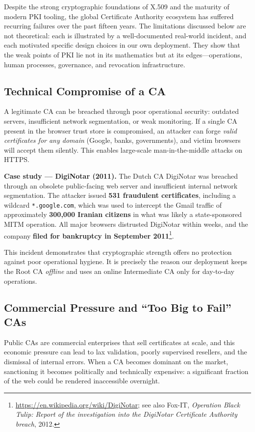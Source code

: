 \documentclass[10pt,twocolumn]{article}
\begin{document}
Despite the strong cryptographic foundations of X.509 and the maturity of
modern PKI tooling, the global Certificate Authority ecosystem has suffered
recurring failures over the past fifteen years. The limitations discussed
below are not theoretical: each is illustrated by a well-documented
real-world incident, and each motivated specific design choices in our
own deployment. They show that the weak points of PKI lie not in its
mathematics but at its edges---operations, human processes, governance,
and revocation infrastructure.

\subsection{Technical Compromise of a CA}

A legitimate CA can be breached through poor operational security: outdated
servers, insufficient network segmentation, or weak monitoring. If a single
CA present in the browser trust store is compromised, an attacker can forge
\emph{valid certificates for any domain} (Google, banks, governments), and
victim browsers will accept them silently. This enables large-scale
man-in-the-middle attacks on HTTPS.

\textbf{Case study --- DigiNotar (2011).} The Dutch CA DigiNotar was
breached through an obsolete public-facing web server and insufficient
internal network segmentation. The attacker issued \textbf{531 fraudulent
certificates}, including a wildcard \texttt{*.google.com}, which was used
to intercept the Gmail traffic of approximately \textbf{300{,}000 Iranian
citizens} in what was likely a state-sponsored MITM operation. All major
browsers distrusted DigiNotar within weeks, and the company \textbf{filed
for bankruptcy in September 2011}\footnote{\url{https://en.wikipedia.org/wiki/DigiNotar}; see also Fox-IT, \textit{Operation Black Tulip: Report of the investigation into the DigiNotar Certificate Authority breach}, 2012.}.

This incident demonstrates that cryptographic strength offers no protection
against poor operational hygiene. It is precisely the reason our deployment
keeps the Root CA \emph{offline} and uses an online Intermediate CA only
for day-to-day operations.

\subsection{Commercial Pressure and ``Too Big to Fail'' CAs}

Public CAs are commercial enterprises that sell certificates at scale, and
this economic pressure can lead to lax validation, poorly supervised
resellers, and the dismissal of internal errors. When a CA becomes dominant
on the market, sanctioning it becomes politically and technically expensive:
a significant fraction of the web could be rendered inaccessible overnight.
\end{document}
